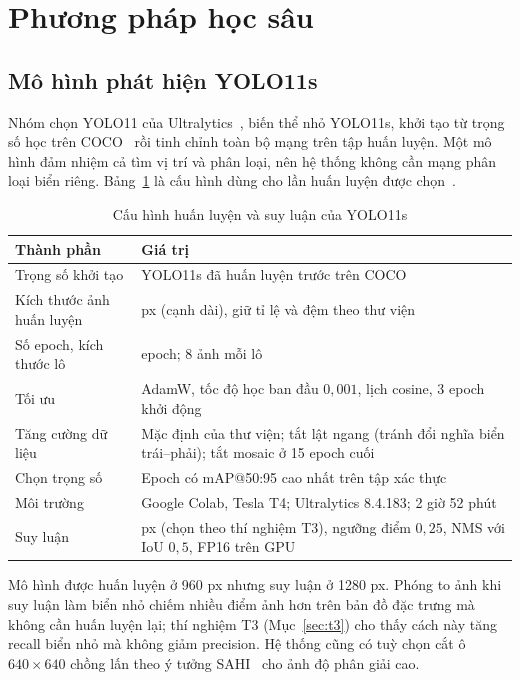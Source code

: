\section{Phương pháp học sâu}
\label{sec:deep}

\subsection{Mô hình phát hiện YOLO11s}
Nhóm chọn YOLO11 của Ultralytics~\cite{ultralytics_yolo11,khanam2024yolo11}, biến thể nhỏ YOLO11s, khởi tạo từ trọng số học trên COCO~\cite{lin2014coco} rồi tinh chỉnh toàn bộ mạng trên tập huấn luyện. Một mô hình đảm nhiệm cả tìm vị trí và phân loại, nên hệ thống không cần mạng phân loại biển riêng. Bảng~\ref{tab:ch2_detector_config} là cấu hình dùng cho lần huấn luyện được chọn~\cite{utci_cauhinh}.

\begin{table}[H]
\centering
\caption{Cấu hình huấn luyện và suy luận của YOLO11s}
\label{tab:ch2_detector_config}
\small
\begin{tabularx}{\textwidth}{|>{\raggedright\arraybackslash}p{3.6cm}|>{\raggedright\arraybackslash}X|}
\toprule
\textbf{Thành phần} & \textbf{Giá trị} \\
\midrule
Trọng số khởi tạo & YOLO11s đã huấn luyện trước trên COCO \\ \hline
Kích thước ảnh huấn luyện & 960 px (cạnh dài), giữ tỉ lệ và đệm theo thư viện \\ \hline
Số epoch, kích thước lô & 80 epoch; 8 ảnh mỗi lô \\ \hline
Tối ưu & AdamW, tốc độ học ban đầu $0{,}001$, lịch cosine, 3 epoch khởi động \\ \hline
Tăng cường dữ liệu & Mặc định của thư viện; tắt lật ngang (tránh đổi nghĩa biển trái--phải); tắt mosaic ở 15 epoch cuối \\ \hline
Chọn trọng số & Epoch có mAP@50:95 cao nhất trên tập xác thực \\ \hline
Môi trường & Google Colab, Tesla T4; Ultralytics 8.4.183; 2 giờ 52 phút \\ \hline
Suy luận & 1280 px (chọn theo thí nghiệm T3), ngưỡng điểm $0{,}25$, NMS với IoU $0{,}5$, FP16 trên GPU \\
\bottomrule
\end{tabularx}
\end{table}

Mô hình được huấn luyện ở 960 px nhưng suy luận ở 1280 px. Phóng to ảnh khi suy luận làm biển nhỏ chiếm nhiều điểm ảnh hơn trên bản đồ đặc trưng mà không cần huấn luyện lại; thí nghiệm T3 (Mục~\ref{sec:t3}) cho thấy cách này tăng recall biển nhỏ mà không giảm precision. Hệ thống cũng có tuỳ chọn cắt ô $640\times640$ chồng lấn theo ý tưởng SAHI~\cite{akyon2022sahi} cho ảnh độ phân giải cao.

